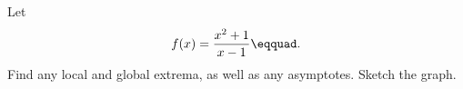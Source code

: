 Let
\begin{equation*}
  f(x) = \frac{x^2+1}{x-1}\eqquad.
\end{equation*}
Find any local and global
extrema, as well as any asymptotes. Sketch the graph.
